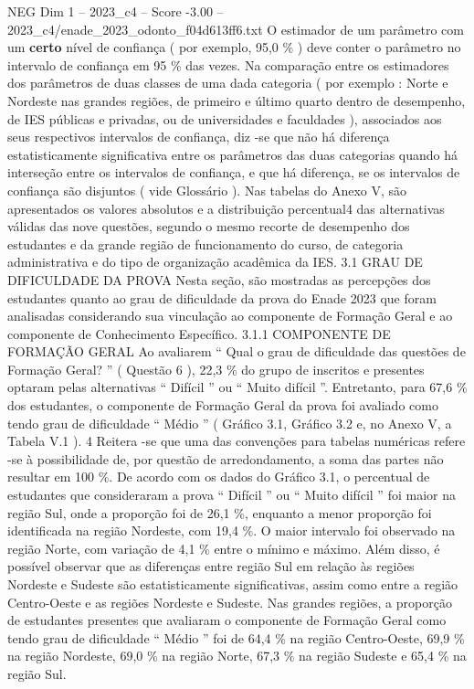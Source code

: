 \begin{textsample}{NEG Dim 1 – 2023\_c4 – Score -3.00 – 2023\_c4/enade\_2023\_odonto\_f04d613ff6.txt}
O estimador de um parâmetro com um \textbf{certo} nível de confiança ( por exemplo, 95,0 \% ) deve conter o parâmetro no intervalo de confiança em 95 \% das vezes.
Na comparação entre os estimadores dos parâmetros de duas classes de uma dada categoria ( por exemplo : Norte e Nordeste nas grandes regiões, de primeiro e último quarto dentro de desempenho, de IES públicas e privadas, ou de universidades e faculdades ), associados aos seus respectivos intervalos de confiança, diz -se que não há diferença estatisticamente significativa entre os parâmetros das duas categorias quando há interseção entre os intervalos de confiança, e que há diferença, se os intervalos de confiança são disjuntos ( vide Glossário ).
Nas tabelas do Anexo V, são apresentados os valores absolutos e a distribuição percentual4 das alternativas válidas das nove questões, segundo o mesmo recorte de desempenho dos estudantes e da grande região de funcionamento do curso, de categoria administrativa e do tipo de organização acadêmica da IES. 3.1 GRAU DE DIFICULDADE DA PROVA Nesta seção, são mostradas as percepções dos estudantes quanto ao grau de dificuldade da prova do Enade 2023 que foram analisadas considerando sua vinculação ao componente de Formação Geral e ao componente de Conhecimento Específico. 3.1.1 COMPONENTE DE FORMAÇÃO GERAL Ao avaliarem “ Qual o grau de dificuldade das questões de Formação Geral? ” ( Questão 6 ), 22,3 \% do grupo de inscritos e presentes optaram pelas alternativas “ Difícil ” ou “ Muito difícil ”.
Entretanto, para 67,6 \% dos estudantes, o componente de Formação Geral da prova foi avaliado como tendo grau de dificuldade “ Médio ” ( Gráfico 3.1, Gráfico 3.2 e, no Anexo V, a Tabela V.1 ). 4 Reitera -se que uma das convenções para tabelas numéricas refere -se à possibilidade de, por questão de arredondamento, a soma das partes não resultar em 100 \%.
De acordo com os dados do Gráfico 3.1, o percentual de estudantes que consideraram a prova “ Difícil ” ou “ Muito difícil ” foi maior na região Sul, onde a proporção foi de 26,1 \%, enquanto a menor proporção foi identificada na região Nordeste, com 19,4 \%.
O maior intervalo foi observado na região Norte, com variação de 4,1 \% entre o mínimo e máximo.
Além disso, é possível observar que as diferenças entre região Sul em relação às regiões Nordeste e Sudeste são estatisticamente significativas, assim como entre a região Centro-Oeste e as regiões Nordeste e Sudeste.
Nas grandes regiões, a proporção de estudantes presentes que avaliaram o componente de Formação Geral como tendo grau de dificuldade “ Médio ” foi de 64,4 \% na região Centro-Oeste, 69,9 \% na região Nordeste, 69,0 \% na região Norte, 67,3 \% na região Sudeste e 65,4 \% na região Sul.

\end{textsample}
